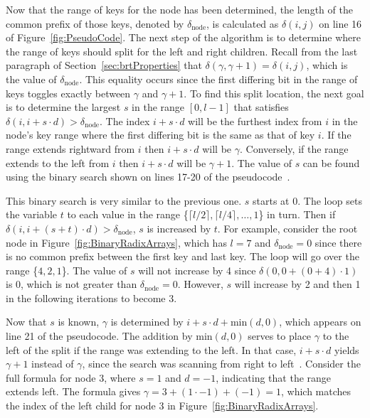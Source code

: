 \documentclass{sig-alternate}
\newcommand{\ceil}[1]{\lceil #1 \rceil}
\begin{document}
Now that the range of keys for the node has been determined, the length of the common prefix of those keys, denoted by $\delta_{\textrm{node}}$, is calculated as $\delta(i,j)$ on line 16 of Figure~\ref{fig:PseudoCode}. The next step of the algorithm is to determine where the range of keys should split for the left and right children. Recall from the last paragraph of Section~\ref{sec:brtProperties} that $\delta(\gamma,\gamma+1)=\delta(i,j)$, which is the value of $\delta_{\textrm{node}}$. This equality occurs since the first differing bit in the range of keys toggles exactly between $\gamma$ and $\gamma+1$. To find this split location, the next goal is to determine the largest $s$ in the range $[0, l-1]$ that satisfies $\delta(i, i+s \cdot d) > \delta_{\textrm{node}}$. The index $i+s \cdot d$ will be the furthest index from $i$ in the node's key range where the first differing bit is the same as that of key $i$. If the range extends rightward from $i$ then $i+s \cdot d$ will be $\gamma$. Conversely, if the range extends to the left from $i$ then $i+s \cdot d$ will be $\gamma+1$. The value of $s$ can be found using the binary search shown on lines 17-20 of the pseudocode~\cite{Karras:2012}.

This binary search is very similar to the previous one. $s$ starts at 0. The loop sets the variable $t$ to each value in the range \{$\ceil{l/2}, \ceil{l/4}, \dots, 1$\} in turn. Then if $\delta(i, i+(s+t) \cdot d)>\delta_{\textrm{node}}$, $s$ is increased by $t$. For example, consider the root node in Figure~\ref{fig:BinaryRadixArrays}, which has $l=7$ and $\delta_{\textrm{node}}=0$ since there is no common prefix between the first key and last key. The loop will go over the range \{$4, 2, 1$\}. The value of $s$ will not increase by 4 since $\delta(0, 0+(0+4) \cdot 1)$ is 0, which is not greater than $\delta_{\textrm{node}}=0$. However, $s$ will increase by 2 and then 1 in the following iterations to become 3.



Now that $s$ is known, $\gamma$ is determined by $i + s \cdot d + \textrm{min}(d, 0)$, which appears on line 21 of the pseudocode. The addition by $\textrm{min}(d, 0)$ serves to place $\gamma$ to the left of the split if the range was extending to the left. In that case, $i + s \cdot d$ yields $\gamma + 1$ instead of $\gamma$, since the search was scanning from right to left~\cite{Karras:2012}. Consider the full formula for node 3, where $s=1$ and $d=-1$, indicating that the range extends left. The formula gives $\gamma=3+(1 \cdot -1) + (-1)=1$, which matches the index of the left child for node 3 in Figure~\ref{fig:BinaryRadixArrays}.
\end{document}
